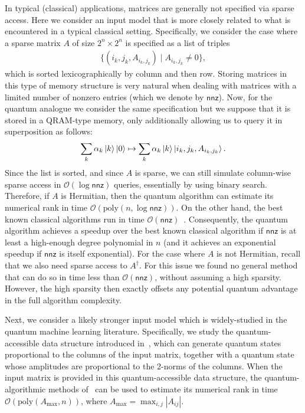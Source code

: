 \documentclass[a4paper, onecolumn, accepted=2022-08-28]{quantumarticle}
\newcommand{\bigO}[1]{\mathcal{O}\left( #1 \right)}
\begin{document}
In typical (classical) applications, matrices are generally not specified via sparse access.
Here we consider an input model that is more closely related to what is encountered in a typical classical setting.
Specifically, we consider the case where a sparse matrix $A$ of size $2^n \times 2^n$ is specified as a list of triples 
\begin{align*}
\big\{(i_k,j_k,A_{i_k, j_k}) \mid A_{i_k, j_k} \neq 0 \big\},
\end{align*}
which is sorted lexicographically by column and then row. 
Storing matrices in this type of memory structure is very natural when dealing with matrices with a limited number of nonzero entries (which we denote by $\mathsf{nnz}$).
Now, for the quantum analogue we consider the same specification but we suppose that it is stored in a QRAM-type memory, only additionally allowing us to query it in superposition as follows:
\begin{align*}
  \sum_k \alpha_k \ket{k}\ket{0} \mapsto \sum_k \alpha_k \ket{k}\ket{i_k, j_k, A_{i_k, j_k}}.
\end{align*}
Since the list is sorted, and since $A$ is sparse, we can still simulate column-wise sparse access in $\bigO{\log \mathsf{nnz}}$ queries, essentially by using binary search.
Therefore, if $A$ is Hermitian, then the quantum algorithm can estimate its numerical rank in time $\bigO{\mathrm{poly}\left(n, \log  \mathsf{nnz}\right)}$.
On the other hand, the best known classical algorithms run in time $\bigO{\mathsf{nnz}}$~\cite{ubaru:approximate_rank, cheung:rank, napoli:eigenvalue_counts, lin:spectral_density}.
Consequently, the quantum algorithm achieves a speedup over the best known classical algorithm if $\mathsf{nnz}$ is at least a high-enough degree polynomial in $n$ (and it achieves an exponential speedup if $\mathsf{nnz}$ is itself exponential).
For the case where $A$ is not Hermitian, recall that we also need sparse access to $A^\dagger$.
For this issue we found no general method that can do so in time less than $\bigO{\mathsf{nnz}}$, without assuming a high sparsity.
However, the high sparsity then exactly offsets any potential quantum advantage in the full algorithm complexity. 

Next, we consider a likely stronger input model which is widely-studied in the quantum machine learning literature.
Specifically, we study the quantum-accessible data structure introduced in~\cite{kerenidis:qrs,kerenidis:qram}, which can generate quantum states proportional to the columns of the input matrix, together with a quantum state whose amplitudes are proportional to the 2-norms of the columns.
When the input matrix is provided in this quantum-accessible data structure, the quantum-algorithmic methods of~\cite{gilyen:block, chakraborty:block} can be used to estimate its numerical rank in time $\bigO{\mathrm{poly}(A_{\text{max}}, n)}$, where $A_{\text{max}} = \max_{i, j}|A_{ij}|$.
\end{document}
